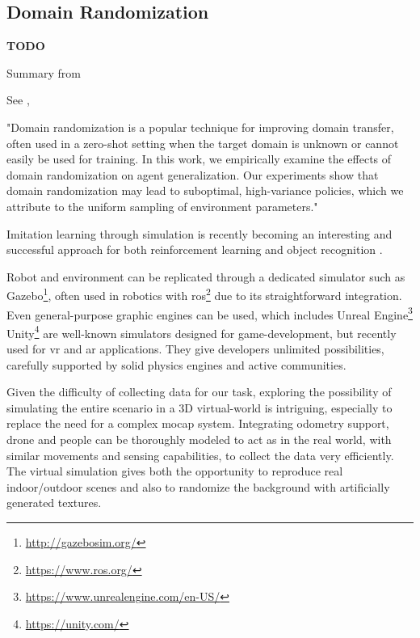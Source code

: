 \subsection{Domain Randomization}
\label{subsec:domain-randomization}

\textbf{TODO}

Summary from \cite{mehta2019active}

See \cite{weng2019DR_explanation}, \cite{tobin2017domain}
 
"Domain randomization is a popular technique for improving domain transfer, often used in a zero-shot setting when the target domain is unknown or cannot easily be used for training. In this work, we empirically examine the effects of domain randomization on agent generalization. Our experiments show that domain randomization may lead to suboptimal, high-variance policies, which we attribute to the uniform sampling of environment parameters."

\medskip

Imitation learning through simulation is recently becoming an interesting and successful approach for both reinforcement learning \cite{imitation_learning_3d_navigation} and object recognition \cite{tobin2017domain} \cite{weng2019DR}.

Robot and environment can be replicated through a dedicated simulator such as Gazebo\footnote{\url{http://gazebosim.org/}}, often used in robotics with \gls{ros}\footnote{\url{https://www.ros.org/}} due to its straightforward integration. Even general-purpose graphic engines can be used, which includes Unreal Engine\footnote{\url{https://www.unrealengine.com/en-US/}} Unity\footnote{\url{https://unity.com/}} are well-known simulators designed for game-development, but recently used for \gls{vr} and \gls{ar} applications. They give developers unlimited possibilities, carefully supported by solid physics engines and active communities.

\medskip

Given the difficulty of collecting data for our task, exploring the possibility of simulating the entire scenario in a 3D virtual-world is intriguing, especially to replace the need for a complex \gls{mocap} system. Integrating odometry support, drone and people can be thoroughly modeled to act as in the real world, with similar movements and sensing capabilities, to collect the data very efficiently. The virtual simulation gives both the opportunity to reproduce real indoor/outdoor scenes and also to randomize the background with artificially generated textures.

